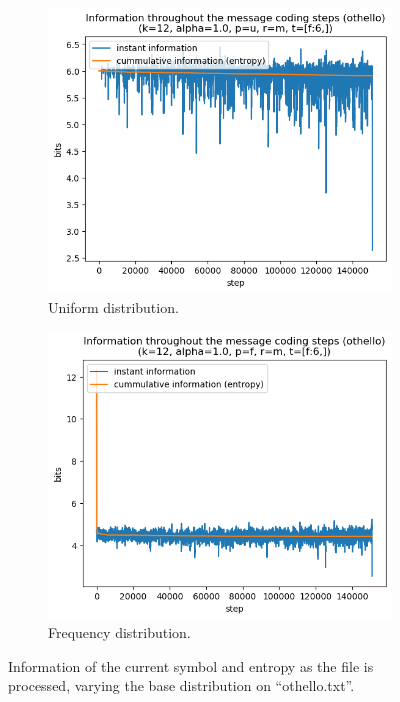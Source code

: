 \documentclass{article}
\begin{document}
\begin{figure}
    \begin{subfigure}[b]{0.45\textwidth}
        \begin{center}
            \includegraphics[width=1.0\linewidth]{../scripts/images/othello_12_1.0_u_m_[f:6,].png}
        \end{center}
        \caption{Uniform distribution.}
        \label{fig:results-distribution-other-uniform}
    \end{subfigure}
    \hfill
    \begin{subfigure}[b]{0.45\textwidth}
        \begin{center}
            \includegraphics[width=1.0\linewidth]{../scripts/images/othello_12_1.0_f_m_[f:6,].png}
        \end{center}
        \caption{Frequency distribution.}
        \label{fig:results-distribution-other-frequency}
    \end{subfigure}
    \caption{Information of the current symbol and entropy as the file is processed, varying the base distribution on ``othello.txt''.}
    \label{fig:results-distribution-other}
\end{figure}
\end{document}
